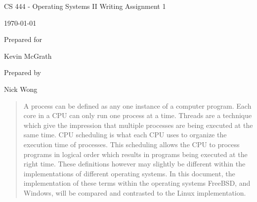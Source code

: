 \documentclass[onecolumn, draftclsnofoot,10pt, compsoc]{IEEEtran}
\def \GroupMemberOne{           Nick Wong}
\def \CapstoneSponsorPerson{        Kevin McGrath}
\def \DocType{    %
        Writing Assignment 1
        }
\newcommand{\NameSigPair}[1]{\par
\makebox[2.75in][r]{#1} \hfil   \makebox[3.25in]{\makebox[2.25in]{\hrulefill} \hfill    \makebox[.75in]{\hrulefill}}
\par\vspace{-12pt} \textit{\tiny\noindent
\makebox[2.75in]{} \hfil    \makebox[3.25in]{\makebox[2.25in][r]{Signature} \hfill  \makebox[.75in][r]{Date}}}}
\begin{document}
\begin{titlepage}
    \begin{singlespace}
        \hfill 
        \par\vspace{.2in}
        \centering
        \scshape{
            \huge CS 444 - Operating Systems II \DocType \par
            {\large\today}\par
            \vspace{.5in}
            \vfill
            {\large Prepared for}\par
            \vspace{5pt}
            {\CapstoneSponsorPerson\par}
            {\large Prepared by }\par
            \GroupMemberOne\par
            \vspace{5pt}
            \vspace{20pt}
        }
        \begin{abstract}
           A process can be defined as any one instance of a computer program. Each core in a CPU can only run one process at a time. Threads are a technique which give the impression that multiple processes are being executed at the same time. CPU scheduling is what each CPU uses to organize the execution time of processes. This scheduling allows the CPU to process programs in logical order which results in programs being executed at the right time. These definitions however may slightly be different within the implementations of different operating systems. In this document, the implementation of these terms within the operating systems FreeBSD, and Windows, will be compared and contrasted to the Linux implementation. 

        \end{abstract}     
    \end{singlespace}
\end{titlepage}
\newpage
{}
\tableofcontents
\clearpage
\end{document}
